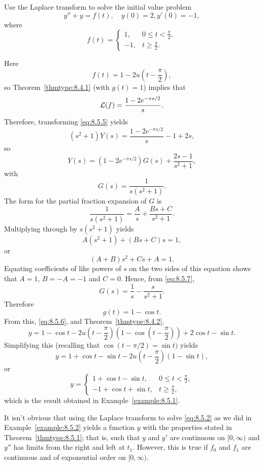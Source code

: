 \documentclass{ximera}
\begin{document}
\begin{example}\label{example:8.5.2}
\space Use the Laplace transform to solve the initial value problem
\begin{equation}\label{eq:8.5.5}
y''+y=f(t), \quad   y(0)=2,  y'(0)=-1,
\end{equation}
where
$$
f(t)=\left\{\begin{array}{cl}
1,&0\leq t<\frac{\pi}{2},\\
-1,&t\geq\frac{\pi}{2}.
\end{array}\right.
$$

\begin{explanation} Here
$$
f(t)=1-2u\left(t-\frac{\pi}{2}\right),
$$
so Theorem~\ref{thmtype:8.4.1} (with $g(t)=1$) implies that
$$
{\cal L}(f)=\frac{1-2e^{-{\pi s/2}}}{s}.
$$
Therefore, transforming  \eqref{eq:8.5.5} yields
$$
(s^2+1)Y(s)=\frac{1-2e^{-{\pi s/ 2}}}{s}-1+2s,
$$
 so
\begin{equation}\label{eq:8.5.6}
Y(s)=(1-2e^{-{\pi s/ 2}}) G(s)+\frac{2s-1}{s^2+1},
\end{equation}
with
$$
G(s)=\frac{1}{s(s^2+1)}.
$$
The form for the partial fraction expansion of $G$ is
\begin{equation}\label{eq:8.5.7}
\frac{1}{s(s^2+1)}=\frac{A}{s}+\frac{Bs+C}{s^2+1}.
\end{equation}
Multiplying through by $s(s^2+1)$ yields
$$
A(s^2+1)+(Bs+C)s=1,
$$
or
$$
(A+B)s^2+Cs+A=1.
$$
Equating coefficients of like powers of $s$ on the two sides of this
equation shows that $A=1$, $B=-A=-1$ and $C=0$. Hence, from
\eqref{eq:8.5.7},
$$
G(s)=\frac{1}{s}-\frac{s}{s^2+1}.
$$
Therefore
$$
g(t)=1-\cos t.
$$
From this, \eqref{eq:8.5.6}, and
Theorem~\ref{thmtype:8.4.2},
$$
y=1-\cos t-2u\left(t-\frac{\pi}{2}\right)\left(1-\cos\left(t-\frac{\pi}{2}\right)\right)+2\cos t-\sin t.
$$
Simplifying this (recalling that $\cos (t-\pi/2)=\sin t)$ yields
$$
y=1+\cos t-\sin t-2u\left(t-\frac{\pi}{2}\right)(1-\sin t),
$$
or
$$
y=\left\{\begin{array}{cl}
1+\cos t-\sin t,&0\leq t<\frac{\pi}{2},\\
-1+\cos t+\sin t,&t\geq \frac{\pi}{2},
\end{array}\right.
$$
which is the result obtained in Example~\ref{example:8.5.1}.
\end{explanation}
\end{example}

\begin{remark}
It isn't obvious that using the Laplace transform to solve
\eqref{eq:8.5.2} as we did in Example~\ref{example:8.5.2} yields a function
$y$ with the properties stated in Theorem~\ref{thmtype:8.5.1}; that is,
such that $y$ and $y'$ are continuous on $[0,\infty)$ and $y''$ has
limits from the right and left at $t_1$. However, this is true if  $f_0$ and $f_1$ are continuous and of exponential order on $[0,\infty)$. 
\end{remark}
\end{document}
